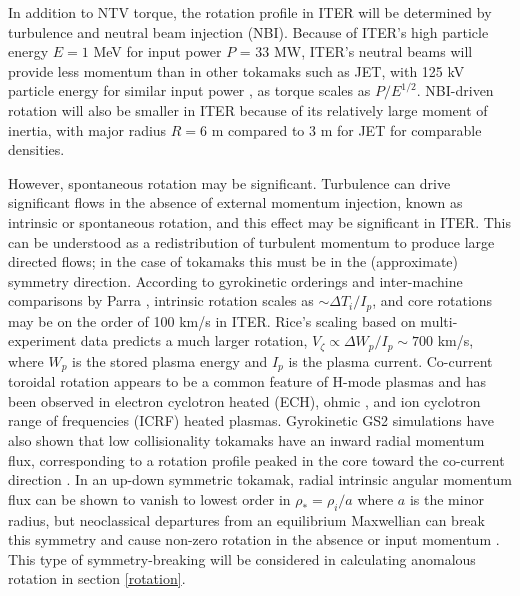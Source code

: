 \documentclass{article}
\begin{document}
In addition to NTV torque, the rotation profile in ITER will be determined by turbulence and neutral beam injection (NBI). 
Because of ITER's high particle energy $E = 1$ MeV for input power $P$ = 33 MW, ITER's neutral beams will provide less momentum than in other tokamaks such as JET, with 125 kV particle energy for similar input power \cite{Ciric2011}, as torque scales as $P/E^{1/2}$. NBI-driven rotation will also be smaller in ITER because of its relatively large moment of inertia, with major radius $R = 6$ m compared to 3 m for JET for comparable densities. 

However, spontaneous rotation may be significant. Turbulence can drive significant flows in the absence of external momentum injection, known as intrinsic or spontaneous rotation, and this effect may be significant in ITER. This can be understood as a redistribution of turbulent momentum to produce large directed flows; in the case of tokamaks this must be in the (approximate) symmetry direction. According to gyrokinetic orderings and inter-machine comparisons by Parra \cite{Parra2012}, intrinsic rotation scales as $\sim \Delta T_i/I_p$, and core rotations may be on the order of 100 km/s in ITER. Rice's scaling based on multi-experiment data \cite{Rice2007} predicts a much larger rotation, $V_{\zeta} \propto \Delta W_p/I_p \sim 700$ km/s, where $W_p$ is the stored plasma energy and $I_p$ is the plasma current. Co-current toroidal rotation appears to be a common feature of H-mode plasmas and has been observed in electron cyclotron heated (ECH)\cite{DeGrassie2007}, ohmic \cite{DeGrassie2007}, and ion cyclotron range of frequencies (ICRF) \cite{Noterdaeme2003} heated plasmas. Gyrokinetic GS2 simulations have also shown that low collisionality tokamaks have an inward radial momentum flux, corresponding to a rotation profile peaked in the core toward the co-current direction \cite{Barnes2013}. In an up-down symmetric tokamak, radial intrinsic angular momentum flux can be shown to vanish to lowest order in $\rho_* = \rho_i/a$ where $a$ is the minor radius, but neoclassical departures from an equilibrium Maxwellian can break this symmetry and cause non-zero rotation in the absence or input momentum \cite{Barnes2013}. This type of symmetry-breaking will be considered in calculating anomalous rotation in section \ref{rotation}. 
\end{document}
